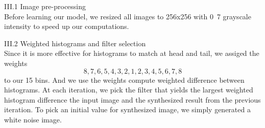 \documentclass[12pt]{article}
\newenvironment{problem}[2][Part]{\begin{trivlist}
\item[\hskip \labelsep {\bfseries #1}\hskip \labelsep {\bfseries #2}]}{\end{trivlist}}
\begin{document}
\begin{problem}{III Methods}
\item{III.1 Image pre-processing\\}
Before learning our model, we resized all images to 256x256 with 0~7 grayscale intensity to speed up our computations.
\item{III.2 Weighted histograms and filter selection\\}
Since it is more effective for histograms to match at head and tail, we assiged the weights \[8, 7, 6, 5, 4, 3, 2, 1, 2, 3, 4, 5, 6, 7, 8\] to our 15 bins. And we use the weights compute weighted difference between histograms. At each iteration, we pick the filter that yields the largest weighted histogram difference the input image and the synthesized result from the previous iteration. To pick an initial value for synthesized image, we simply generated a white noise image.
\end{problem}
\end{document}
